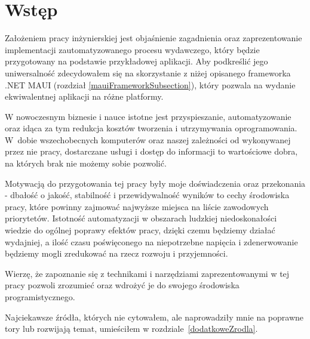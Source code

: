 \section{Wstęp}

Założeniem pracy inżynierskiej jest objaśnienie zagadnienia oraz zaprezentowanie 
implementacji zautomatyzowanego procesu wydawczego, który będzie 
przygotowany na podstawie przykładowej aplikacji. 
Aby podkreślić jego u\-ni\-wer\-sal\-ność zdecydowałem się na skorzystanie z niżej opisanego frameworka 
.NET MAUI (rozdział \ref{mauiFrameworkSubsection}), który pozwala na wydanie ekwiwalentnej aplikacji na różne platformy.

W nowoczesnym biznesie i nauce istotne jest przyspieszanie, automatyzowanie 
oraz idąca za tym redukcja kosztów tworzenia i utrzymywania oprogramowania.
W~dobie wszechobecnych komputerów oraz naszej zależności od wykonywanej przez 
nie pracy, dostarczane usługi i dostęp do informacji to wartościowe dobra, 
na których brak nie możemy sobie pozwolić.

Motywacją do przygotowania tej pracy były moje doświadczenia oraz przekonania - 
dbałość o jakość, stabilność i przewidywalność wyników to cechy środowiska pracy, 
które powinny zajmować najwyższe miejsca na liście zawodowych priorytetów.
Istotność automatyzacji w obszarach ludzkiej niedoskonałości wiedzie do 
ogólnej poprawy efektów pracy, dzięki czemu będziemy działać wydajniej, 
a ilość czasu poświęconego na niepotrzebne napięcia i zdenerwowanie będziemy mogli 
zredukować na rzecz rozwoju i przyjemności.

Wierzę, że zapoznanie się z technikami i narzędziami zaprezentowanymi w tej pracy 
pozwoli zrozumieć oraz wdrożyć je do swojego środowiska programistycznego.

Najciekawsze źródła, których nie cytowałem, ale naprowadziły mnie na poprawne tory lub rozwijają temat, 
umieściłem w rozdziale~\ref{dodatkoweZrodla}.

